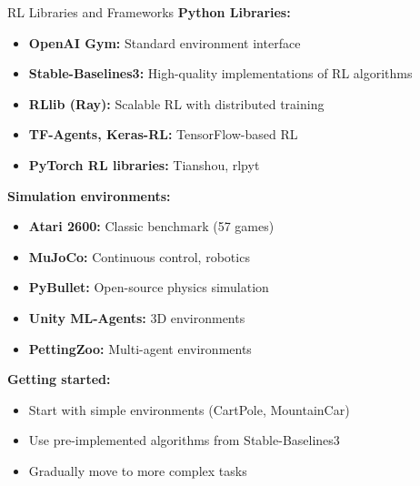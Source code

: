 \documentclass[aspectratio=169]{beamer}
\begin{document}
\begin{frame}{RL Libraries and Frameworks}
  \textbf{Python Libraries:}
  \begin{itemize}
    \item \textbf{OpenAI Gym:} Standard environment interface
    \item \textbf{Stable-Baselines3:} High-quality implementations of RL algorithms
    \item \textbf{RLlib (Ray):} Scalable RL with distributed training
    \item \textbf{TF-Agents, Keras-RL:} TensorFlow-based RL
    \item \textbf{PyTorch RL libraries:} Tianshou, rlpyt
  \end{itemize}

  \vspace{0.5em}

  \textbf{Simulation environments:}
  \begin{itemize}
    \item \textbf{Atari 2600:} Classic benchmark (57 games)
    \item \textbf{MuJoCo:} Continuous control, robotics
    \item \textbf{PyBullet:} Open-source physics simulation
    \item \textbf{Unity ML-Agents:} 3D environments
    \item \textbf{PettingZoo:} Multi-agent environments
  \end{itemize}

  \vspace{0.5em}

  \textbf{Getting started:}
  \begin{itemize}
    \item Start with simple environments (CartPole, MountainCar)
    \item Use pre-implemented algorithms from Stable-Baselines3
    \item Gradually move to more complex tasks
  \end{itemize}
\end{frame}
\end{document}
